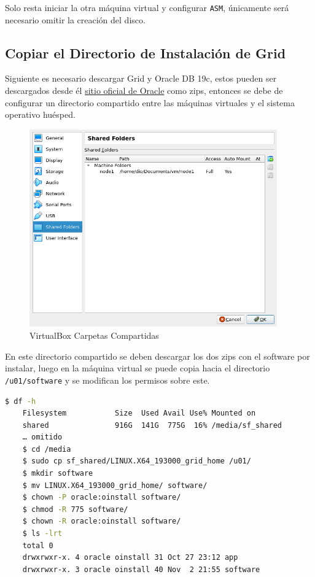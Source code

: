 \documentclass{article}
\begin{document}
Solo resta iniciar la otra máquina virtual y configurar \texttt{ASM}, únicamente será necesario omitir la creación del disco.

\subsection{Copiar el Directorio de Instalación de Grid}

Siguiente es necesario descargar Grid y Oracle DB 19c, estos pueden ser descargados desde él \hyperlink{https://www.oracle.com/in/database/technologies/oracle19c-linux-downloads.html}{sitio oficial de Oracle} como zips, entonces se debe de configurar un directorio compartido entre las máquinas virtuales y el sistema operativo huésped.

\begin{figure}[H]
		\begin{center}
			\includegraphics[width=0.95\textwidth]{vm_shared_folder.png}
		\end{center}
		\caption{VirtualBox Carpetas Compartidas}
\end{figure}

En este directorio compartido se deben descargar los dos zips con el software por instalar, luego en la máquina virtual se puede copia hacia el directorio \texttt{/u01/software} y se modifican los permisos sobre este.

\begin{lstlisting}[style=mystyle,language=bash]
	$ df -h 
	Filesystem           Size  Used Avail Use% Mounted on
	shared               916G  141G  775G  16% /media/sf_shared
	… omitido
	$ cd /media
	$ sudo cp sf_shared/LINUX.X64_193000_grid_home /u01/
	$ mkdir software
	$ mv LINUX.X64_193000_grid_home/ software/
	$ chown -P oracle:oinstall software/
	$ chmod -R 775 software/ 
	$ chown -R oracle:oinstall software/
	$ ls -lrt 
	total 0
	drwxrwxr-x. 4 oracle oinstall 31 Oct 27 23:12 app
	drwxrwxr-x. 3 oracle oinstall 40 Nov  2 21:55 software
\end{lstlisting}
\end{document}
